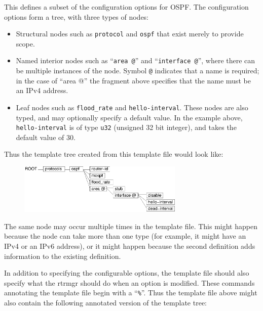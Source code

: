 \documentclass[11pt]{article}
\begin{document}
This defines a subset of the configuration options for OSPF.  The
configuration options form a tree, with three types of nodes:

\begin{itemize}

  \item Structural nodes such as {\tt protocol} and {\tt ospf} that exist
  merely to provide scope.

  \item Named interior nodes such as ``{\tt area @}'' and
  ``{\tt interface @}'', where there can be multiple instances of the node.
  Symbol {\tt @} indicates that a name is required; in the case of ``area @''
  the fragment above specifies that the name must be an IPv4 address.

  \item Leaf nodes such as  {\tt flood\_rate} and
  {\tt hello-interval}.  These nodes are also typed, and may optionally
  specify a default value.  In the example above, {\tt hello-interval} is
  of type {\tt u32} (unsigned 32 bit integer), and takes the default value of
  30.

\end{itemize}

Thus the template tree created from this template file would look like:

\begin{figure}[htb]
\centerline{\includegraphics[width=0.7\textwidth]{figs/template}}
\vspace{.05in}
\end{figure}

The same node may occur multiple times in the template file.  This
might happen because the node can take more than one type (for
example, it might have an IPv4 or an IPv6 address), or it might happen
because the second definition adds information to the existing
definition.

In addition to specifying the configurable options, the template file
should also specify what the rtrmgr should do when an option is
modified.  These commands annotating the template file begin with a
``{\tt \%}''.  Thus the template file above might also contain the
following annotated version of the template tree:
\end{document}

